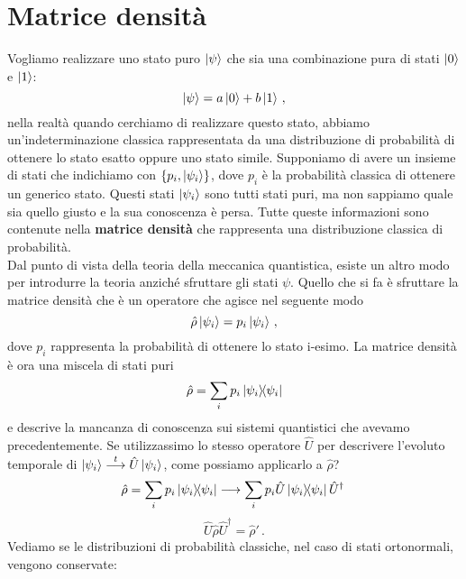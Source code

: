 \section{Matrice densità}
Vogliamo realizzare uno stato puro $\ket \psi$ che sia una combinazione pura di stati $\ket 0$ e $\ket 1$:
\begin{equation*}
    \ket \psi = a\ket 0 + b \ket 1\, ,
\end{equation*}
nella realtà quando cerchiamo di realizzare questo stato, abbiamo un'indeterminazione classica rappresentata da una distribuzione di probabilità di ottenere lo stato esatto oppure uno stato simile. Supponiamo di avere un insieme di stati che indichiamo con $\{p_i, \ket{\psi_i}\}$, dove $p_i$ è la probabilità classica di ottenere un generico stato. Questi stati $\ket{\psi_i}$ sono tutti stati puri, ma non sappiamo quale sia quello giusto e la sua conoscenza è persa. Tutte queste informazioni sono contenute nella \textbf{matrice densità} che rappresenta una distribuzione classica di probabilità.\\
Dal punto di vista della teoria della meccanica quantistica, esiste un altro modo per introdurre la teoria anziché sfruttare gli stati $\psi$. Quello che si fa è sfruttare la matrice densità che è un operatore che agisce nel seguente modo
\begin{equation*}
    \hat \rho \ket{\psi_i}=p_i\ket{\psi_i}\, ,
\end{equation*}
dove $p_i$ rappresenta la probabilità di ottenere lo stato i-esimo. La matrice densità è ora una miscela di stati puri
\begin{equation*}
    \hat \rho = \sum_i p_i \op{\psi_i}{\psi_i}
\end{equation*}
e descrive la mancanza di conoscenza sui sistemi quantistici che avevamo precedentemente. Se utilizzassimo lo stesso operatore $\hat U$ per descrivere l'evoluto temporale di $\ket{\psi_i} \overset{t}{\longrightarrow} \hat U\ket{\psi_i}$, come possiamo applicarlo a $\hat \rho$?
\begin{equation*}
    \hat \rho = \sum_i p_i \op{\psi_i}{\psi_i} \longrightarrow \sum_i p_i \hat U\op{\psi_i}{\psi_i}\hat U^\dagger \,
\end{equation*}
\begin{equation*}
    \hat U \hat \rho \hat U^\dagger = \hat \rho ' \, .
\end{equation*}
Vediamo se le distribuzioni di probabilità classiche, nel caso di stati ortonormali, vengono conservate:

